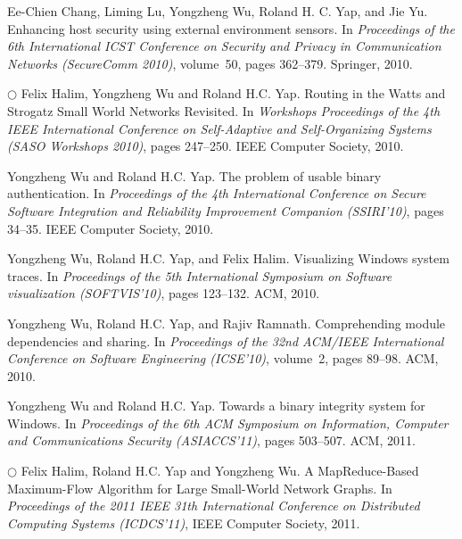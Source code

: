 \begin{tightenumerate}
\item
Ee-Chien Chang, Liming Lu, Yongzheng Wu, Roland H. C. Yap, and Jie Yu.
\newblock Enhancing host security using external environment sensors.
\newblock In {\em Proceedings of the 6th International ICST Conference on
  Security and Privacy in Communication Networks (SecureComm 2010)}, volume~50,
  pages 362--379. Springer, 2010.

\item $\bigcirc$
Felix Halim, Yongzheng Wu and Roland H.C. Yap.
\newblock Routing in the Watts and Strogatz Small World Networks Revisited.
\newblock In {\em Workshops Proceedings of the 4th IEEE International
  Conference on Self-Adaptive and Self-Organizing Systems
  (SASO Workshops 2010)},
  pages 247--250. IEEE Computer Society, 2010.

\item
Yongzheng Wu and Roland H.C. Yap.
\newblock The problem of usable binary authentication.
\newblock In {\em Proceedings of the 4th International Conference on Secure
  Software Integration and Reliability Improvement Companion (SSIRI'10)}, pages 34--35.
  IEEE Computer Society, 2010.

\item
Yongzheng Wu, Roland H.C. Yap, and Felix Halim.
\newblock Visualizing Windows system traces.
\newblock In {\em Proceedings of the 5th International Symposium on Software
  visualization (SOFTVIS'10)}, pages 123--132. ACM, 2010.

\item
Yongzheng Wu, Roland H.C. Yap, and Rajiv Ramnath.
\newblock Comprehending module dependencies and sharing.
\newblock In {\em Proceedings of the 32nd ACM/IEEE International Conference on
  Software Engineering (ICSE'10)}, volume~2, pages 89--98. ACM, 2010.

\item
Yongzheng Wu and Roland H.C. Yap.
\newblock Towards a binary integrity system for Windows.
\newblock In {\em Proceedings of the 6th ACM Symposium on Information, Computer
  and Communications Security (ASIACCS'11)},
  pages 503--507. ACM, 2011.

\item $\bigcirc$
Felix Halim, Roland H.C. Yap and Yongzheng Wu.
\newblock A MapReduce-Based Maximum-Flow Algorithm for Large Small-World
  Network Graphs.
\newblock In {\em Proceedings of the 2011 IEEE 31th International Conference on
  Distributed Computing Systems (ICDCS'11)},
  IEEE Computer Society, 2011.
\end{tightenumerate}

